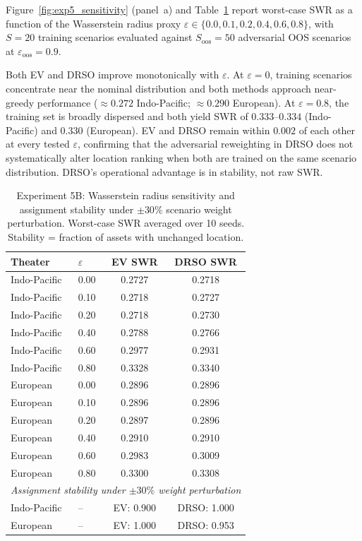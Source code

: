 \documentclass[11pt]{article}
\begin{document}
Figure~\ref{fig:exp5_sensitivity} (panel~a) and Table~\ref{tab:exp5_sensitivity}
report worst-case SWR as a function of the Wasserstein radius proxy
$\varepsilon \in \{0.0, 0.1, 0.2, 0.4, 0.6, 0.8\}$, with $S = 20$
training scenarios evaluated against $S_\mathrm{oos} = 50$ adversarial
OOS scenarios at $\varepsilon_\mathrm{oos} = 0.9$.

Both EV and DRSO improve monotonically with $\varepsilon$.
At $\varepsilon = 0$, training scenarios concentrate near the nominal
distribution and both methods approach near-greedy performance
($\approx 0.272$ Indo-Pacific; $\approx 0.290$ European).
At $\varepsilon = 0.8$, the training set is broadly dispersed and both
yield SWR of $0.333$--$0.334$ (Indo-Pacific) and $0.330$ (European).
EV and DRSO remain within $0.002$ of each other at every tested
$\varepsilon$, confirming that the adversarial reweighting in DRSO
does not systematically alter location ranking when both are trained
on the same scenario distribution.  DRSO's operational advantage is
in stability, not raw SWR.

\begin{table}[htbp]
\centering
\caption{Experiment 5B: Wasserstein radius sensitivity and assignment
stability under $\pm30\%$ scenario weight perturbation.
Worst-case SWR averaged over 10 seeds.
Stability = fraction of assets with unchanged location.}
\label{tab:exp5_sensitivity}
\begin{tabular}{llcc}
\toprule
Theater & $\varepsilon$ & EV SWR & DRSO SWR \\
\midrule
Indo-Pacific & 0.00 & 0.2727 & 0.2718 \\
Indo-Pacific & 0.10 & 0.2718 & 0.2727 \\
Indo-Pacific & 0.20 & 0.2718 & 0.2730 \\
Indo-Pacific & 0.40 & 0.2788 & 0.2766 \\
Indo-Pacific & 0.60 & 0.2977 & 0.2931 \\
Indo-Pacific & 0.80 & 0.3328 & 0.3340 \\
\midrule
European & 0.00 & 0.2896 & 0.2896 \\
European & 0.10 & 0.2896 & 0.2896 \\
European & 0.20 & 0.2897 & 0.2896 \\
European & 0.40 & 0.2910 & 0.2910 \\
European & 0.60 & 0.2983 & 0.3009 \\
European & 0.80 & 0.3300 & 0.3308 \\
\midrule
\multicolumn{4}{l}{\textit{Assignment stability under $\pm30\%$ weight
perturbation}} \\
\midrule
Indo-Pacific & -- & EV: 0.900 & DRSO: 1.000 \\
European     & -- & EV: 1.000 & DRSO: 0.953 \\
\bottomrule
\end{tabular}
\end{table}
\end{document}
